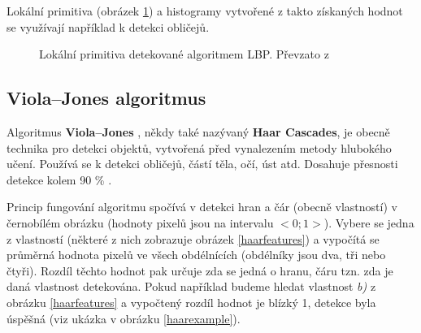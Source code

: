 Lokální primitiva (obrázek \ref{lbpprimitives}) a histogramy vytvořené z takto získaných hodnot se využívají například k detekci obličejů.

\begin{figure}[H]
  \begin{center}
  \label{lbpprimitives}
  \caption{Lokální primitiva detekované algoritmem LBP. Převzato z \cite{localBinaryPatternsTests}}
  \end{center}
\end{figure}

\subsection*{Viola--Jones algoritmus}
Algoritmus \textbf{Viola--Jones} \cite{violaJonesArticle, violaJones}, někdy také nazývaný \textbf{Haar Cascades}, je obecně technika pro detekci objektů, vytvořená před vynalezením metody hlubokého učení. Používá se k detekci obličejů, částí těla, očí, úst atd. Dosahuje přesnosti detekce kolem 90 \% \cite{violaJones}. 

Princip fungování algoritmu spočívá v detekci hran a čár (obecně vlastností) v černobílém obrázku (hodnoty pixelů jsou na intervalu $<0; 1>$). Vybere se jedna z vlastností (některé z nich zobrazuje obrázek \ref{haarfeatures}) a vypočítá se průměrná hodnota pixelů ve všech obdélnících (obdélníky jsou dva, tři nebo čtyři). Rozdíl těchto hodnot pak určuje zda se jedná o hranu, čáru tzn. zda je daná vlastnost detekována. Pokud například budeme hledat vlastnost \emph{b)} z obrázku \ref{haarfeatures} a vypočtený rozdíl hodnot je blízký 1, detekce byla úspěšná (viz ukázka v obrázku \ref{haarexample}).

